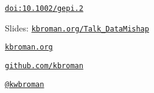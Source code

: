 \documentclass[aspectratio=169,12pt,t]{beamer}
\begin{document}
\begin{frame}[c]{}

\bigskip \bigskip



\hfill \scriptsize \href{https://doi.org/10.1002/gepi.2}{\tt \lolit doi:10.1002/gepi.2}

\end{frame}






\begin{frame}[c]{}

\Large

Slides: \href{https://kbroman.org/Talk_DataMishap}{\tt kbroman.org/Talk\_DataMishap}

\vspace{7mm}

\href{https://kbroman.org}{\tt \lolit kbroman.org}

\vspace{7mm}

\href{https://github.com/kbroman}{\tt \lolit github.com/kbroman}

\vspace{7mm}

\href{https://twitter.com/kwbroman}{\tt \lolit @kwbroman}


\end{frame}
\end{document}
